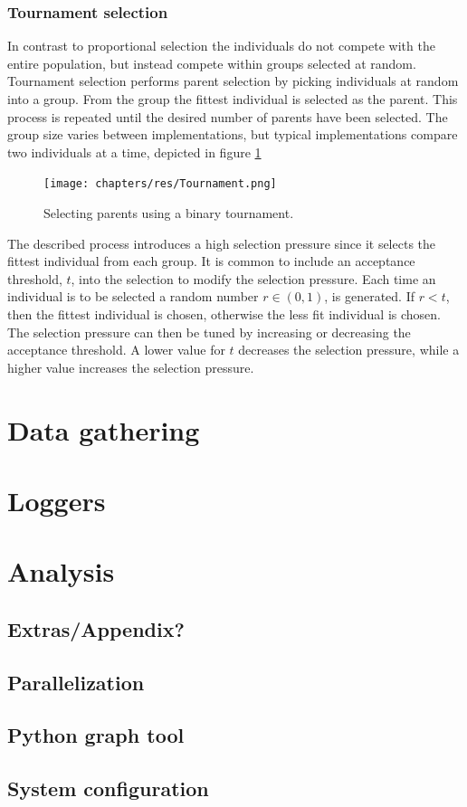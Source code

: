 		\subsubsection{Tournament selection}
		In contrast to proportional selection the individuals do not compete with the entire population, but instead compete within groups selected at random.
		Tournament selection performs parent selection by picking individuals at random into a group.
		From the group the fittest individual is selected as the parent.
		This process is repeated until the desired number of parents have been selected.
		The group size varies between implementations, but typical implementations compare two\cite{goh_sexual_2003} individuals at a time, depicted in figure \ref{fig:tournament}
		
				\begin{figure}[H]
					
					\centering
					\texttt{[image: chapters/res/Tournament.png]}
					\caption{Selecting parents using a binary tournament.}
					\label{fig:tournament}
				\end{figure}
		The described process introduces a high selection pressure since it selects the fittest individual from each group.
		It is common to include an acceptance threshold, $t$, into the selection to modify the selection pressure\cite{goh_sexual_2003}.
		Each time an individual is to be selected a random number $r \in (0, 1)$, is generated.
		If $r < t$, then the fittest individual is chosen, otherwise the less fit individual is chosen. The selection pressure can then be tuned by increasing or decreasing the acceptance threshold. A lower value for $t$ decreases the selection pressure, while a higher value increases the selection pressure.
		
\clearpage
\section{Data gathering}
	\section{Loggers}
	\section{Analysis}
\clearpage
\subsection{Extras/Appendix?}
	\subsection{Parallelization}
	\subsection{Python graph tool}
	\subsection{System configuration}
\clearpage
	